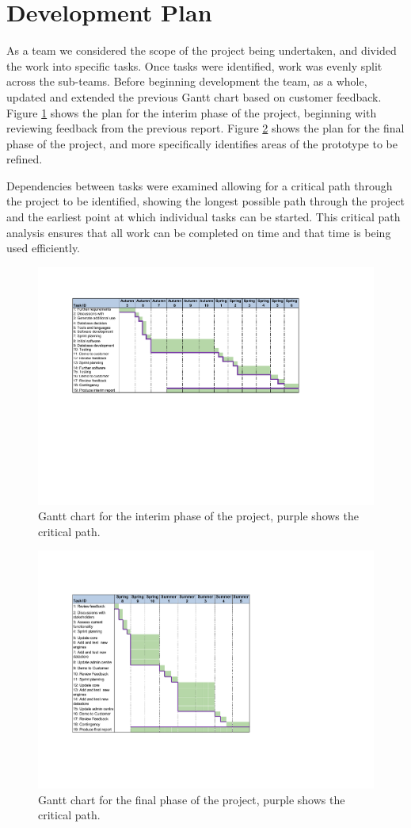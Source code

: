 \section{Development Plan}
\label{sec:developmentplan}

As a team we considered the scope of the project being undertaken, and 
divided the work into specific tasks. Once tasks were identified, work was 
evenly split across the sub-teams.
Before beginning development the team, as a whole, updated and extended 
the previous Gantt chart based on customer feedback.
Figure \ref{fig:ganttInterim}  shows the plan for the interim phase of the project, 
beginning with reviewing feedback from the previous report.
Figure \ref{fig:ganttFinal}  shows the plan for the final phase of the project, and 
more specifically identifies areas of the prototype to be refined.

Dependencies between tasks were examined allowing for a critical path 
through the project to be identified, showing the longest possible path through 
the project and the earliest point at which individual tasks can be started.
This critical path analysis ensures that all work can be completed on time and 
that time is being used efficiently. 

\begin{figure}[ht!]
  \centering
  \includegraphics[width= 15cm]{images/GantInterim.pdf}
  \caption{Gantt chart for the interim phase of the project, purple shows the critical path.}
  \label{fig:ganttInterim}
\end{figure}

\begin{figure}[ht!]
  \centering
  \includegraphics[width= 12cm]{images/GantFinal.pdf}
  \caption{Gantt chart for the final phase of the project, purple shows the critical path.}
  \label{fig:ganttFinal}
\end{figure}
